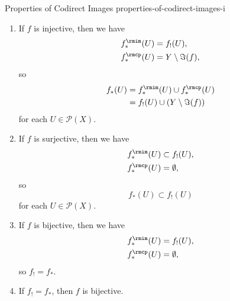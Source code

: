 \begin{proposition}{Properties of Codirect Images \rmI}{properties-of-codirect-images-i}
\begin{enumerate}
            \begin{align*}
                f_{*}(U) &= f_{!}(U^{\sfc})^{\sfc}\\
                         &= Y\setminus f_{!}(X\setminus U)
            \end{align*}
            for each $U\in\mathcal{P}(X)$.
        \item\label{properties-of-codirect-images-i-interaction-with-injections}If $f$ is injective, then we have
            \begin{align*}
                f^{\rmim}_{*}(U) &= f_{!}(U),\\
                f^{\rmcp}_{*}(U) &= Y\setminus\Im(f),
            \end{align*}
            so
            \begin{align*}
                f_{*}(U) &= f^{\rmim}_{*}(U)\cup f^{\rmcp}_{*}(U)\\
                         &= f_{!}(U)\cup(Y\setminus\Im(f))
            \end{align*}
            for each $U\in\mathcal{P}(X)$.
        \item\label{properties-of-codirect-images-i-interaction-with-surjections}If $f$ is surjective, then we have
            \begin{align*}
                f^{\rmim}_{*}(U) &\subset  f_{!}(U),\\
                f^{\rmcp}_{*}(U) &=       \emptyset,\\
            \end{align*}
            so
            \[
                f_{*}(U)%
                \subset%
                f_{!}(U)%
            \]%
            for each $U\in\mathcal{P}(X)$.
        \item\label{properties-of-codirect-images-i-interaction-with-bijections-1}If $f$ is bijective, then we have
            \begin{align*}
                f^{\rmim}_{*}(U) &=  f_{!}(U),\\
                f^{\rmcp}_{*}(U) &= \emptyset,
            \end{align*}
            so $f_{!}=f_{*}$.
        \item\label{properties-of-codirect-images-i-interaction-with-bijections-2}If $f_{!}=f_{*}$, then $f$ is bijective.
    \end{enumerate}
\end{proposition}
